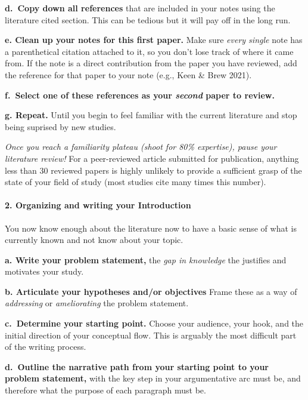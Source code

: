 \documentclass[
]{book}
\begin{document}
\textbf{d.~Copy down all references} that are included in your notes using the literature cited section. This can be tedious but it will pay off in the long run.

\textbf{e. Clean up your notes for this first paper.} Make sure \emph{every single} note has a parenthetical citation attached to it, so you don't lose track of where it came from. If the note is a direct contribution from the paper you have reviewed, add the reference for that paper to your note (e.g., Keen \& Brew 2021).

\textbf{f.~Select one of these references as your \emph{second} paper to review.}

\textbf{g. Repeat.} Until you begin to feel familiar with the current literature and stop being suprised by new studies.

\emph{Once you reach a familiarity plateau (shoot for 80\% expertise), pause your literature review!} For a peer-reviewed article submitted for publication, anything less than 30 reviewed papers is highly unlikely to provide a sufficient grasp of the state of your field of study (most studies cite many times this number).

\hypertarget{organizing-and-writing-your-introduction}{%
\paragraph*{2. Organizing and writing your Introduction}\label{organizing-and-writing-your-introduction}}

You now know enough about the literature now to have a basic sense of what is currently known and not know about your topic.

\textbf{a. Write your problem statement,} the \emph{gap in knowledge} the justifies and motivates your study.

\textbf{b. Articulate your hypotheses and/or objectives} Frame these as a way of \emph{addressing} or \emph{ameliorating} the problem statement.

\textbf{c.~Determine your starting point.} Choose your audience, your hook, and the initial direction of your conceptual flow. This is arguably the most difficult part of the writing process.

\textbf{d.~Outline the narrative path from your starting point to your problem statement,} with the key step in your argumentative arc must be, and therefore what the purpose of each paragraph must be.
\end{document}
